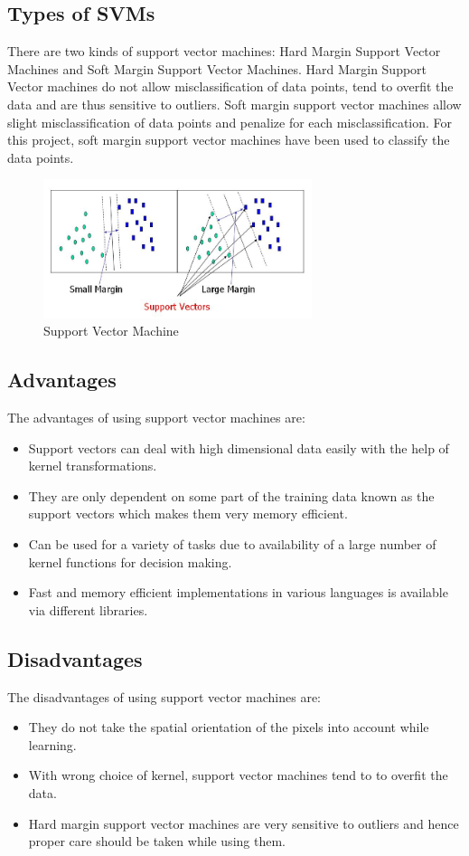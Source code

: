 \documentclass[12pt, a4paper]{report}
\begin{document}
\subsection{Types of SVMs}
There are two kinds of support vector machines: Hard Margin Support Vector Machines and Soft Margin Support Vector Machines.
Hard Margin Support Vector machines do not allow misclassification of data points, tend to overfit the data and are thus sensitive to outliers. Soft margin support vector machines allow slight misclassification of data points and penalize for each misclassification.
For this project, soft margin support vector machines have been used to classify the data points.
\begin{figure}[h]
\centering
\includegraphics[width=0.7\textwidth]{supportvectormachines.jpg}
\caption{Support Vector Machine}
\end{figure}
\subsection{Advantages}
The advantages of using support vector machines are:
\begin{itemize}
\item Support vectors can deal with high dimensional data easily with the help of kernel transformations.
\item They are only dependent on some part of the training data known as the support vectors which makes them very memory efficient.
\item Can be used for a variety of tasks due to availability of a large number of kernel functions for decision making.
\item Fast and memory efficient implementations in various languages is available via different libraries.
\end{itemize}
\subsection{Disadvantages}
The disadvantages of using support vector machines are:
\begin{itemize}
\item They do not take the spatial orientation of the pixels into account while learning.
\item With wrong choice of kernel, support vector machines tend to to overfit the data.
\item Hard margin support vector machines are very sensitive to outliers and hence proper care should be taken while using them.
\end{itemize}
\end{document}

